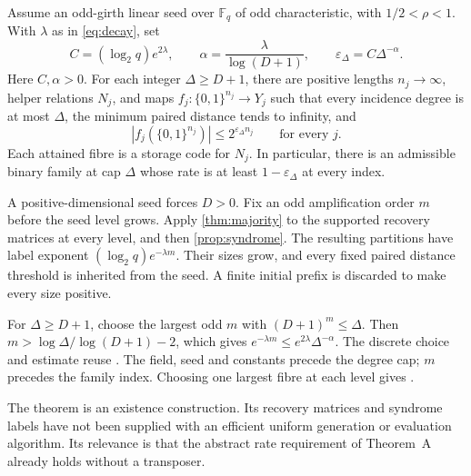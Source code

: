 \begin{theorem}\label{thm:construction}
Assume an odd-girth linear seed over $\mathbb F_q$ of odd characteristic,
with $1/2<\rho<1$. With $\lambda$ as in \cref{eq:decay}, set
\begin{equation}\label{eq:construction-constants}
 C=(\log_2q)e^{2\lambda},\qquad
 \alpha=\frac{\lambda}{\log(D+1)},\qquad
 \varepsilon_\Delta=C\Delta^{-\alpha}.
\end{equation}
Here $C,\alpha>0$. For each integer $\Delta\ge D+1$, there are positive
lengths $n_j\to\infty$, helper relations $N_j$, and maps
$f_j:\{0,1\}^{n_j}\to Y_j$ such that every incidence degree is at
most $\Delta$, the minimum paired distance tends to infinity, and
\[
 |f_j(\{0,1\}^{n_j})|\le2^{\varepsilon_\Delta n_j}
 \qquad\text{for every }j.
\]
Each attained fibre is a storage code for $N_j$. In particular, there
is an admissible binary family at cap $\Delta$ whose rate is at least
$1-\varepsilon_\Delta$ at every index.
\end{theorem}
\begin{outline}
A positive-dimensional seed forces $D>0$. Fix an odd amplification
order $m$ before the seed level grows. Apply \cref{thm:majority} to
the supported recovery matrices at every level, and then
\cref{prop:syndrome}. The resulting partitions have label exponent
$(\log_2q)e^{-\lambda m}$. Their sizes grow, and every fixed paired
distance threshold is inherited from the seed. A finite initial prefix
is discarded to make every size positive.

For $\Delta\ge D+1$, choose the largest odd $m$ with
$(D+1)^m\le\Delta$. Then
$m>\log\Delta/\log(D+1)-2$, which gives
$e^{-\lambda m}\le e^{2\lambda}\Delta^{-\alpha}$.
The discrete choice and estimate reuse
.
The field, seed and constants precede the degree cap; $m$ precedes
the family index. Choosing one largest fibre at each level gives
.
\end{outline}

The theorem is an existence construction. Its recovery matrices and
syndrome labels have not been supplied with an efficient uniform
generation or evaluation algorithm. Its relevance is that the abstract
rate requirement of Theorem~A already holds without a transposer.
